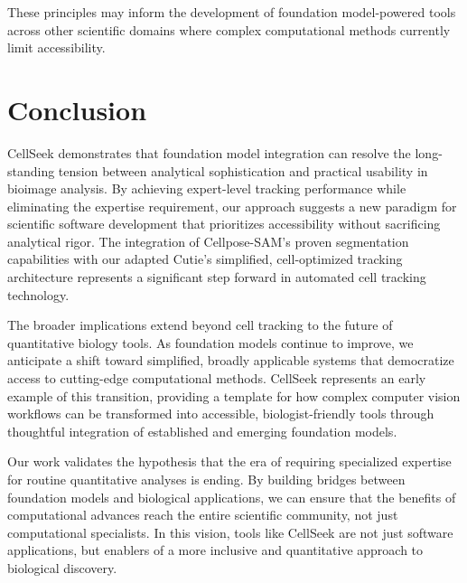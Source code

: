 \documentclass[12pt]{article}
\begin{document}
These principles may inform the development of foundation model-powered tools across other scientific domains where complex computational methods currently limit accessibility.

\section{Conclusion}

CellSeek demonstrates that foundation model integration can resolve the long-standing tension between analytical sophistication and practical usability in bioimage analysis. By achieving expert-level tracking performance while eliminating the expertise requirement, our approach suggests a new paradigm for scientific software development that prioritizes accessibility without sacrificing analytical rigor. The integration of Cellpose-SAM's proven segmentation capabilities with our adapted Cutie's simplified, cell-optimized tracking architecture represents a significant step forward in automated cell tracking technology.

The broader implications extend beyond cell tracking to the future of quantitative biology tools. As foundation models continue to improve, we anticipate a shift toward simplified, broadly applicable systems that democratize access to cutting-edge computational methods. CellSeek represents an early example of this transition, providing a template for how complex computer vision workflows can be transformed into accessible, biologist-friendly tools through thoughtful integration of established and emerging foundation models.

Our work validates the hypothesis that the era of requiring specialized expertise for routine quantitative analyses is ending. By building bridges between foundation models and biological applications, we can ensure that the benefits of computational advances reach the entire scientific community, not just computational specialists. In this vision, tools like CellSeek are not just software applications, but enablers of a more inclusive and quantitative approach to biological discovery.
\end{document}
